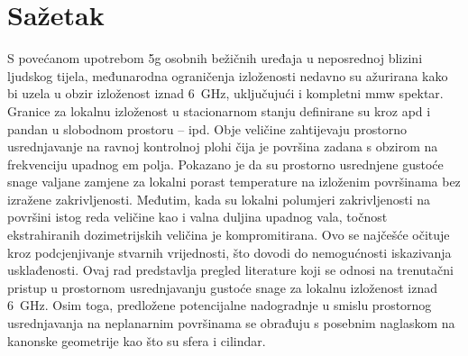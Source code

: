 \chapter*{Sažetak}

S povećanom upotrebom \gls{5g} osobnih bežičnih uređaja u neposrednoj blizini ljudskog tijela, međunarodna ograničenja izloženosti nedavno su ažurirana kako bi uzela u obzir izloženost iznad \SI{6}{\GHz}, uključujući i kompletni \gls{mmw} spektar.
Granice za lokalnu izloženost u stacionarnom stanju definirane su kroz \gls{apd} i pandan u slobodnom prostoru -- \gls{ipd}.
Obje veličine zahtijevaju prostorno usrednjavanje na ravnoj kontrolnoj plohi čija je površina zadana s obzirom na frekvenciju upadnog \gls{em} polja.
Pokazano je da su prostorno usrednjene gustoće snage valjane zamjene za lokalni porast temperature na izloženim površinama bez izražene zakrivljenosti.
Međutim, kada su lokalni polumjeri zakrivljenosti na površini istog reda veličine kao i valna duljina upadnog vala, točnost ekstrahiranih dozimetrijskih veličina je kompromitirana.
Ovo se najčešće očituje kroz podcjenjivanje stvarnih vrijednosti, što dovodi do nemogućnosti iskazivanja usklađenosti.
Ovaj rad predstavlja pregled literature koji se odnosi na trenutačni pristup u prostornom usrednjavanju gustoće snage za lokalnu izloženost iznad \SI{6}{\GHz}.
Osim toga, predložene potencijalne nadogradnje u smislu prostornog usrednjavanja na neplanarnim površinama se obrađuju s posebnim naglaskom na kanonske geometrije kao što su sfera i cilindar.